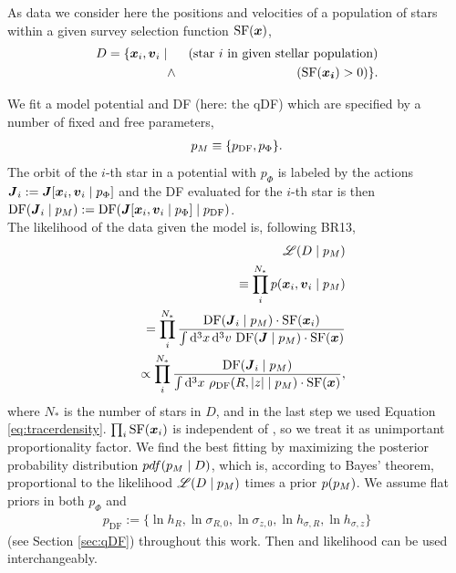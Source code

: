 As data we consider here the positions and velocities of a population of stars within a given survey selection function $\text{SF}(\boldsymbol{x})$,
\begin{eqnarray*}
D  =\{ \boldsymbol{x}_i,\boldsymbol{v}_i \mid && \text{(star $i$ in given stellar population)}\nonumber\\
&\wedge& (\text{SF}(\boldsymbol{x_i}) > 0) \}.
\end{eqnarray*}

We fit a model potential and DF (here: the qDF) which are specified by a number of fixed and free parameters,
\begin{eqnarray*}
p_M \equiv \{ p_\text{DF} , p_\Phi \}.
\end{eqnarray*}
The orbit of the $i$-th star in a potential with $p_\Phi$ is labeled by the actions $\boldsymbol{J}_i := \boldsymbol{J}[\boldsymbol{x}_i,\boldsymbol{v}_i\mid p_{\Phi}]$ and the DF evaluated for the $i$-th star is then $\text{DF}(\boldsymbol{J}_i \mid p_M) := \text{DF}(\boldsymbol{J}[\boldsymbol{x}_i,\boldsymbol{v}_i\mid p_{\Phi}] \mid p_\text{DF})$.\\

The likelihood of the data given the model is, following BR13,
\begin{eqnarray}
&&\mathscr{L}(D \mid p_M) \nonumber\\
&&\equiv \prod_i^{N_*} p(\boldsymbol{x}_i,\boldsymbol{v}_i \mid p_M) \nonumber\\
&&= \prod_i^{N_*} \frac{\text{DF}(\boldsymbol{J}_i \mid p_M) \cdot \text{SF}(\boldsymbol{x}_i)}{\int \mathop{}\!\mathrm{d^3} x \mathop{}\!\mathrm{d^3} v \  \text{DF}(\boldsymbol{J} \mid p_M) \cdot \text{SF}(\boldsymbol{x})}\nonumber\\
&&\propto \prod_i^{N_*} \frac{\text{DF}(\boldsymbol{J}_i \mid p_M)}{\int \mathop{}\!\mathrm{d^3} x \  \rho_\text{DF}(R,|z| \mid p_M) \cdot \text{SF}(\boldsymbol{x})}, \label{eq:prob}
\end{eqnarray}
where $N_*$ is the number of stars in $D$, and in the last step we used Equation \ref{eq:tracerdensity}. $\prod_i\text{SF}(\boldsymbol{x}_i)$ is independent of \pmodel{}, so we treat it as unimportant proportionality factor. We find the best fitting \pmodel{} by maximizing the posterior probability distribution $pdf{}(p_M \mid D)$, which is, according to Bayes' theorem, proportional to the likelihood $\mathscr{L}(D\mid p_M)$ times a prior $p(p_M)$. We assume flat priors in both $p_\Phi$ and
\begin{eqnarray}
p_\text{DF} := \{ \ln h_R, \ln \sigma_{R,0}, \ln \sigma_{z,0}, \ln h_{\sigma,R}, \ln h_{\sigma,z} \} \label{eq:p_DF}
\end{eqnarray}
(see Section \ref{sec:qDF}) throughout this work. Then \pdf{} and likelihood can be used interchangeably.\\

